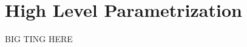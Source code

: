 \documentclass[../main.tex]{subfiles}
\begin{document}
\section{High Level Parametrization} \label{highLevel}
BIG TING HERE
\end{document}
